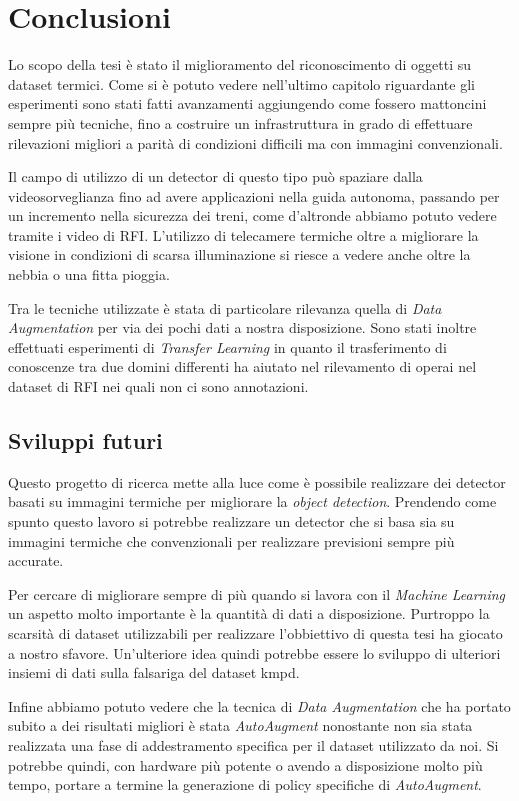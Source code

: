\chapter{Conclusioni}
Lo scopo della tesi è stato il miglioramento del riconoscimento di oggetti su dataset termici. Come si è potuto vedere nell'ultimo capitolo riguardante gli esperimenti sono stati fatti avanzamenti aggiungendo come fossero mattoncini sempre più tecniche, fino a costruire un infrastruttura in grado di effettuare rilevazioni migliori a parità di condizioni difficili ma con immagini convenzionali. 

Il campo di utilizzo di un detector di questo tipo può spaziare dalla videosorveglianza fino ad avere applicazioni nella guida autonoma, passando per un incremento nella sicurezza dei treni, come d'altronde abbiamo potuto vedere tramite i video di \ac{RFI}. L'utilizzo di telecamere termiche oltre a migliorare la visione in condizioni di scarsa illuminazione si riesce a vedere anche oltre la nebbia o una fitta pioggia. 

Tra le tecniche utilizzate è stata di particolare rilevanza quella di \textit{Data Augmentation} per via dei pochi dati a nostra disposizione. Sono stati inoltre effettuati esperimenti di \textit{Transfer Learning} in quanto il trasferimento di conoscenze tra due domini differenti ha aiutato nel rilevamento di operai nel dataset di \ac{RFI} nei quali non ci sono annotazioni. 

\section{Sviluppi futuri}
Questo progetto di ricerca mette alla luce come è possibile realizzare dei detector basati su immagini termiche per migliorare la \textit{object detection}. Prendendo come spunto questo lavoro si potrebbe realizzare un detector che si basa sia su immagini termiche che convenzionali per realizzare previsioni sempre più accurate.

Per cercare di migliorare sempre di più quando si lavora con il \textit{Machine Learning} un aspetto molto importante è la quantità di dati a disposizione. Purtroppo la scarsità di dataset utilizzabili per realizzare l'obbiettivo di questa tesi ha giocato a nostro sfavore. Un'ulteriore idea quindi potrebbe essere lo sviluppo di ulteriori insiemi di dati sulla falsariga del dataset \acf{kmpd}. 

Infine abbiamo potuto vedere che la tecnica di \textit{Data Augmentation} che ha portato subito a dei risultati migliori è stata \textit{AutoAugment} nonostante non sia stata realizzata una fase di addestramento specifica per il dataset utilizzato da noi. Si potrebbe quindi, con hardware più potente o avendo a disposizione molto più tempo, portare a termine la generazione di policy specifiche di \textit{AutoAugment}. 